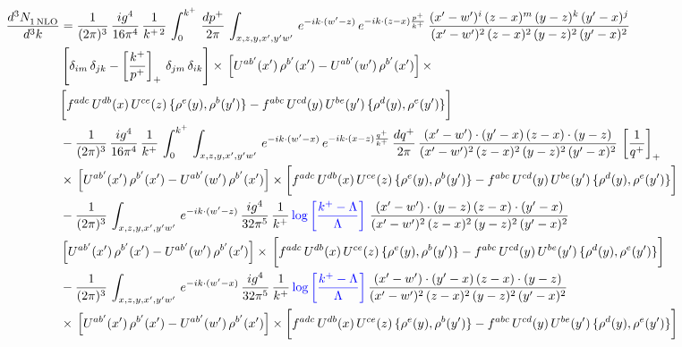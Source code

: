 \documentclass[9pt]{article}
\numberwithin{equation}{section}
\begin{document}
\begin{align}
     \frac{d^{3}N_{1\,\rm NLO}^{\rm}}{d^{3}k}  & = \frac{1}{(2\pi)^{3}}\, \frac{ig^{4}}{16\pi^{4}}\, \frac{1}{k^{+\,2}}\,\int_{0}^{k^{+}}\, \frac{dp^{+}}{2\pi}\,\int_{x,z,y,x',y'w'}\,e^{-ik\cdot (w^\prime-z)}\,e^{-ik\cdot (z-x)\frac{p^{+}}{k^{+}}}\,\frac{(x'-w')^{i}\,(z-x)^{m}\,(y-z)^{k}\,(y'-x)^{j}}{(x'-w')^{2}\,(z-x)^{2}\,(y-z)^{2}\,(y'-x)^{2}}\,\notag \\ & \left[\delta_{im}\,\delta_{jk}-\left[\frac{k^{+}}{p^{+}}\right]_{+}\, \delta_{jm}\,\delta_{ik}\right]\times\, \left[U^{ab'}(x')\,\rho^{b'}(x')-U^{ab'}(w')\,\rho^{b'}(x')\right]\times\notag \\ & \bigg[f^{adc}\,U^{db}(x)\,U^{ce}(z)\, \{\rho^{e}(y),\rho^{b}(y')\}-f^{abc}\,U^{cd}(y)\,U^{be}(y')\, \{\rho^{d}(y),\rho^{e}(y')\}\bigg]\notag \\ & -\frac{1}{(2\pi)^{3}}\, \frac{ig^{4}}{16\pi^{4}}\, \frac{1}{k^{+}}\,\int_{0}^{k^{+}}\, \int_{x,z,y,x',y'w'}\,e^{-ik\cdot (w^\prime-x)}\,e^{-ik\cdot (x-z)\frac{q^{+}}{k^{+}}}\,\frac{dq^{+}}{2\pi}\,\frac{(x'-w')\cdot (y'-x)\,(z-x)\cdot (y-z)}{(x'-w')^{2}\,(z-x)^{2}\,(y-z)^{2}\,(y'-x)^{2}}\,\left[\frac{1}{q^{+}}\right]_{+}\notag \\ & \times\, \left[U^{ab'}(x')\,\rho^{b'}(x')-U^{ab'}(w')\,\rho^{b'}(x')\right]\times \bigg[f^{adc}\,U^{db}(x)\,U^{ce}(z)\, \{\rho^{e}(y),\rho^{b}(y')\}-f^{abc}\,U^{cd}(y)\,U^{be}(y')\, \{\rho^{d}(y),\rho^{e}(y')\}\bigg]\notag \\ & -\frac{1}{(2\pi)^{3}}\, \int_{x,z,y,x',y'w'}\,e^{-ik\cdot (w^\prime-z)}\,\frac{ig^{4}}{32\pi^{5}}\, \frac{1}{k^{+}}\,{\color{blue} \log{\left[\frac{k^{+}-\Lambda}{\Lambda}\right]}}\,\,\frac{(x'-w')\cdot (y-z)\,(z-x)\cdot (y'-x)}{(x'-w')^{2}\,(z-x)^{2}\,(y-z)^{2}\,(y'-x)^{2}}\,\notag \\ & \left[U^{ab'}(x')\,\rho^{b'}(x')-U^{ab'}(w')\,\rho^{b'}(x')\right]\times\, \bigg[f^{adc}\,U^{db}(x)\,U^{ce}(z)\, \{\rho^{e}(y),\rho^{b}(y')\}-f^{abc}\,U^{cd}(y)\,U^{be}(y')\, \{\rho^{d}(y),\rho^{e}(y')\}\bigg]\notag \\ &  -\frac{1}{(2\pi)^{3}}\, \int_{x,z,y,x',y'w'}\,e^{-ik\cdot (w^\prime-x)}\,\frac{ig^{4}}{32\pi^{5}}\, \frac{1}{k^{+}}\,{\color{blue} \log{\left[\frac{k^{+}-\Lambda}{\Lambda}\right]}}\,\frac{(x'-w')\cdot (y'-x)\,(z-x)\cdot (y-z)}{(x'-w')^{2}\,(z-x)^{2}\,(y-z)^{2}\,(y'-x)^{2}}\notag \\ & \times\, \left[U^{ab'}(x')\,\rho^{b'}(x')-U^{ab'}(w')\,\rho^{b'}(x')\right]\times \bigg[f^{adc}\,U^{db}(x)\,U^{ce}(z)\, \{\rho^{e}(y),\rho^{b}(y')\}-f^{abc}\,U^{cd}(y)\,U^{be}(y')\, \{\rho^{d}(y),\rho^{e}(y')\}\bigg]
\end{align}
\end{document}
